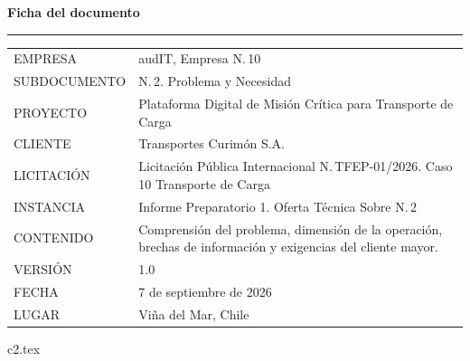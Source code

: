 \documentclass[12pt, letterpaper, table, xcdraw]{inf-pucv}
\begin{document}

\thispagestyle{empty}
\vspace*{1.2cm}
{\color{audITnavy}\fontsize{28}{32}\selectfont\bfseries Ficha del documento}

\vspace{10pt}
{\color{audITteal}\rule{\linewidth}{2pt}}

\vspace{22pt}
{\small
\begin{longtable}{@{}p{3.5cm}p{10.5cm}@{}}
\color{audITgris}EMPRESA & \color{black}audIT, Empresa N.\textordmasculine{}\,10 \\
\color{audITgris}SUBDOCUMENTO & \color{black}N.\textordmasculine{}\,2. Problema y Necesidad \\
\color{audITgris}PROYECTO & \color{black}Plataforma Digital de Misión Crítica para Transporte de Carga \\
\color{audITgris}CLIENTE & \color{black}Transportes Curimón S.A. \\
\color{audITgris}LICITACIÓN & \color{black}Licitación Pública Internacional N.\textordmasculine{}\,TFEP-01/2026. Caso 10 Transporte de Carga \\
\color{audITgris}INSTANCIA & \color{black}Informe Preparatorio 1. Oferta Técnica Sobre N.\textordmasculine{}\,2 \\
\color{audITgris}CONTENIDO & \color{black}Comprensión del problema, dimensión de la operación, brechas de información y exigencias del cliente mayor. \\
\color{audITgris}VERSIÓN & \color{black}1.0 \\
\color{audITgris}FECHA & \color{black}7 de septiembre de 2026 \\
\color{audITgris}LUGAR & \color{black}Viña del Mar, Chile \\
\end{longtable}}
\clearpage

\setcounter{page}{1}
\renewcommand{\contentsname}{Índice}
\tableofcontents
\clearpage

{c2.tex}

\clearpage
{}
{}
\printbibliography[title={Bibliografía}]
\end{document}
